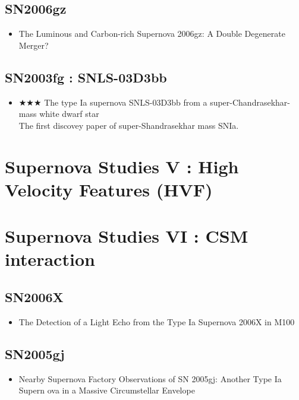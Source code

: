 \subsection{SN2006gz}
\begin{itemize}
\item The Luminous and Carbon-rich Supernova 2006gz: A Double Degenerate Merger?
\citep{hicken07a}\\
\end{itemize}

\subsection{SN2003fg : SNLS-03D3bb}
\begin{itemize}
\item $\bigstar\bigstar\bigstar$
The type Ia supernova SNLS-03D3bb from a super-Chandrasekhar-mass white dwarf star
\citep{howell06a} \\
The first discovey paper of super-Shandrasekhar mass SNIa.
\end{itemize}

\section{Supernova Studies V  : High Velocity Features (HVF)}

\section{Supernova Studies VI  : CSM interaction}

\subsection{SN2006X}
\begin{itemize}
\item The Detection of a Light Echo from the Type Ia Supernova 2006X in M100
\citep{wang08a}\\
\end{itemize}

\subsection{SN2005gj}
\begin{itemize}
\item Nearby Supernova Factory Observations of SN 2005gj: Another Type Ia Supern
ova in a Massive Circumstellar Envelope
\citep{aldering06a}\\
\end{itemize}

